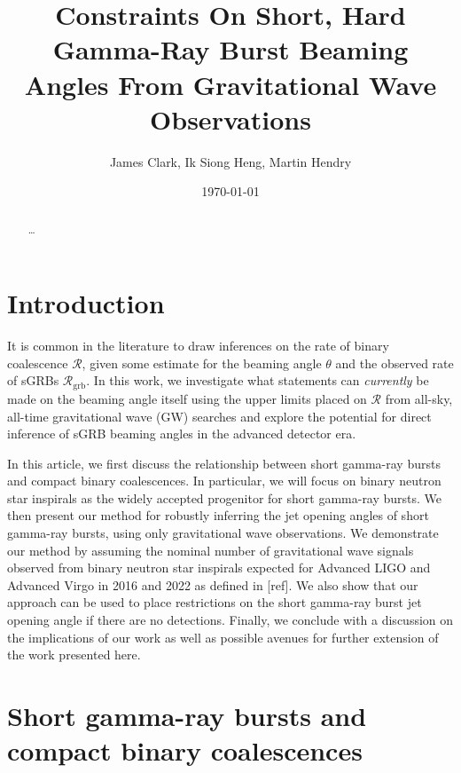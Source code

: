 \documentclass[twocolumn,nofootinbib]{revtex4-1}
\newcommand{\grbrate}{{{\mathcal R}_{\mathrm{grb}}}}
\newcommand{\cbcrate}{{{\mathcal R}}}
\def\gw#1{gravitational wave#1 (GW#1)\gdef\gw{GW}}
\begin{document}
\title{Constraints On Short, Hard Gamma-Ray Burst Beaming Angles From
Gravitational Wave Observations}
\author{James Clark, Ik Siong Heng, Martin Hendry}
\date{\today}

\begin{abstract}
\dots
\end{abstract}

\maketitle

\section{Introduction}

It is common in the literature to draw inferences on the rate of binary
coalescence $\cbcrate$, given some estimate for the beaming angle $\theta$ and
the observed rate of sGRBs $\grbrate$.  In this work, we investigate what
statements can \emph{currently} be made on the beaming angle itself using the
upper limits placed on $\cbcrate$ from all-sky, all-time \gw{} searches and
explore the potential for direct inference of sGRB  beaming angles in the
advanced detector era.

In this article, we first discuss the relationship between short gamma-ray bursts
and compact binary coalescences. In particular, we will focus on binary neutron 
star inspirals as the widely accepted progenitor for short gamma-ray bursts.
We then present our method for robustly inferring the jet opening angles of 
short gamma-ray bursts, using only gravitational wave observations. We 
demonstrate our method by assuming the nominal number of gravitational
wave signals observed from binary neutron star inspirals expected for
Advanced LIGO and Advanced Virgo in 2016 and 2022 as defined in [ref]. 
We also show that our approach can be used to place restrictions on the
short gamma-ray burst jet opening angle if there are no detections.
Finally, we conclude with a discussion on the implications of our work
as well as possible avenues for further extension of the work presented
here.

\section{Short gamma-ray bursts and compact binary coalescences}
\end{document}
